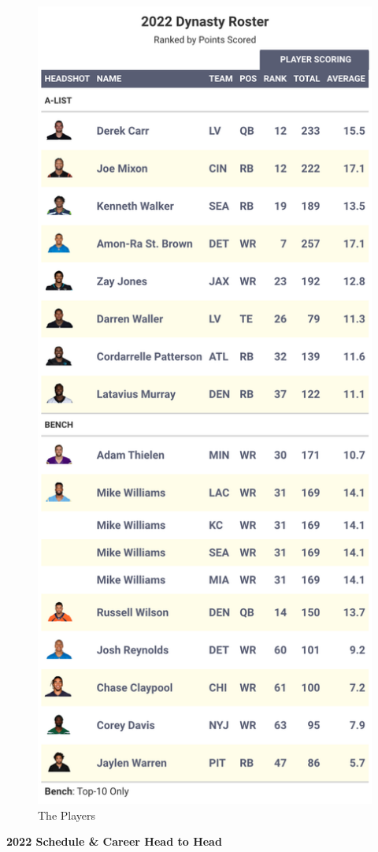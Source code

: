\documentclass[
]{article}
\begin{document}
\begin{figure}
\includegraphics[width=0.75\linewidth,height=0.75\textheight]{output/2022/dynasty_roster_Elrandal} \caption{The Players}\label{fig:unnamed-chunk-30}
\end{figure}
\newpage

\textbf{2022 Schedule \& Career Head to Head}
\end{document}
